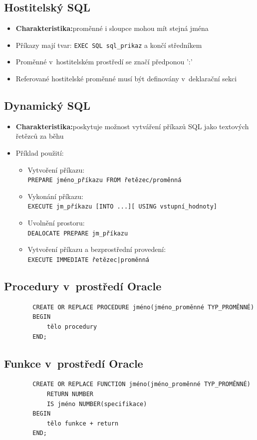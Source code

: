 \documentclass[a4paper,10pt]{article}
\newcommand{\pojem}[2]{\item \textbf{#1:}\quad #2}
\begin{document}
		\subsection{Hostitelský SQL}
			\begin{itemize}
				\pojem{Charakteristika}{proměnné i sloupce mohou mít stejná jména}
				\item Příkazy mají tvar: \texttt{EXEC SQL sql\_prikaz} a končí středníkem
				\item Proměnné v~hostitelském prostředí se značí předponou ':'
				\item Referované hostitelské proměnné musí být definovány v~deklarační sekci
			\end{itemize}
		\subsection{Dynamický SQL}
			\begin{itemize}
				\pojem{Charakteristika}{poskytuje možnost vytváření příkazů SQL jako textových řetězců za běhu}
				\item Příklad použití:
				\begin{itemize}
					\item Vytvoření příkazu: \\ \texttt{PREPARE jméno\_příkazu FROM řetězec/proměnná}
­ 					\item Vykonání příkazu: \\ \texttt{EXECUTE jm\_příkazu [INTO ...][ USING vstupní\_hodnoty]}
­ 					\item Uvolnění prostoru: \\ \texttt{DEALOCATE PREPARE jm\_příkazu}
					\item Vytvoření příkazu a bezprostřední provedení: \\ \texttt{EXECUTE IMMEDIATE řetězec|proměnná}
				\end{itemize}
			\end{itemize}

		\subsection{Procedury v~prostředí Oracle}
		\begin{verbatim}
		CREATE OR REPLACE PROCEDURE jméno(jméno_proměnné TYP_PROMĚNNÉ) 
		BEGIN
		    tělo procedury
		END;	
		\end{verbatim}

		\subsection{Funkce v~prostředí Oracle}
		\begin{verbatim}
		CREATE OR REPLACE FUNCTION jméno(jméno_proměnné TYP_PROMĚNNÉ) 
		    RETURN NUMBER
		    IS jméno NUMBER(specifikace)
		BEGIN
		    tělo funkce + return
		END;
		\end{verbatim}
\end{document}
